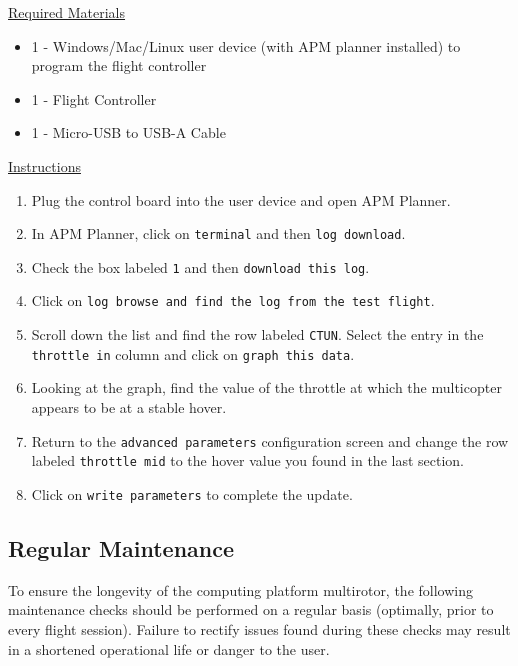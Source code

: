 \documentclass[10pt,letterpaper]{article}
\begin{document}
\underline{Required Materials}
\begin{itemize}
    \item 1 - Windows/Mac/Linux user device (with APM planner installed) to program the flight controller 
\item 1 - Flight Controller
\item 1 - Micro-USB to USB-A Cable
\end{itemize}

\underline{Instructions}
\begin{enumerate}
    \item Plug the control board into the user device and open APM Planner.
    \item In APM Planner, click on \texttt{terminal} and then \texttt{log download}. 
    \item Check the box labeled \texttt{1} and then \texttt{download this log}. 
    \item Click on \texttt{log browse and find the log from the test flight}. 
    \item Scroll down the list and find the row labeled \texttt{CTUN}. Select the entry in the \texttt{throttle in} column and click on \texttt{graph this data}.
    \item Looking at the graph, find the value of the throttle at which the multicopter appears to be at a stable hover.
    \item Return to the \texttt{advanced parameters} configuration screen and change the row labeled \texttt{throttle mid} to the hover value you found in the last section. 
    \item Click on \texttt{write parameters} to complete the update.

\end{enumerate}

\subsection{Regular Maintenance}
To ensure the longevity of the computing platform multirotor, the following maintenance checks should be performed on a regular basis (optimally, prior to every flight session). Failure to rectify issues found during these checks may result in a shortened operational life or danger to the user.
\end{document}
